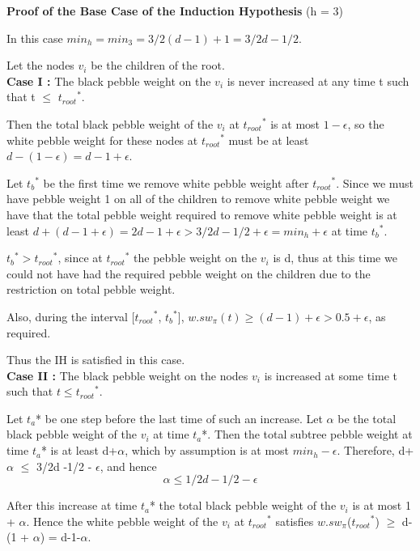 \documentclass[12pt]{article}
\newcommand{\troots}{{t_{root}}^*}
\newcommand{\tbs}{{t_b}^{*}}
\begin{document}
\noindent
{\bf Proof of the Base Case of the Induction Hypothesis}  (h = 3)

In this case $min_h = min_3 = 3/2(d-1) + 1 = 3/2d -1/2$.

Let the nodes $v_i$ be the children of the root.\\

\noindent
{\bf Case I :} The black pebble weight on the $v_i$ is never increased at any time t such that t $\leq$
$\troots$.  

Then the total black pebble weight of the $v_i$ at
$\troots$ is at most $1-\epsilon$, so the white pebble weight for these nodes at
$\troots$ must be at least $d-(1-\epsilon) = d-1+ \epsilon$.

Let $\tbs$ be the first time we remove white pebble weight after $\troots$. Since we must have pebble weight 1 on all of the children to remove white pebble weight we have that the total pebble weight required to remove white
pebble weight is at least
$d+(d - 1 + \epsilon) = 2d - 1 + \epsilon > 3/2d - 1/2 + \epsilon = min_h + \epsilon$ at time $\tbs$. 

$\tbs > \troots$, since at $\troots$ the pebble weight on the $v_i$ is d, thus at this time we could not have had the required pebble weight on the children due to the restriction on total pebble weight.

Also, during the interval [$\troots$, $\tbs$],
$w.sw_\pi(t) \geq (d-1) + \epsilon > 0.5 + \epsilon$, as required. 

Thus the IH is satisfied in this case.\\

\noindent
{\bf Case II :}  The black pebble weight on the nodes $v_i$ is increased at some time t such that $t \leq
\troots$.  

Let $t_a$* be one step before the last time of such an increase.
Let $\alpha$ be the total black pebble weight of the $v_i$ at time $t_a$*.
Then the total subtree pebble weight at time $t_a$* is at least d+$\alpha$,
which by assumption is at most $min_h - \epsilon$.  Therefore, d+ $\alpha$ $\le$ 3/2d -1/2 - $\epsilon$, and hence 
\begin{equation}\alpha \le 1/2d - 1/2 - \epsilon \label{05eps}\end{equation}
      
After this increase at time $t_a$* the total black pebble weight of the $v_i$
is at most 1 + $\alpha$.  Hence the white pebble weight of the $v_i$ at
$\troots$ satisfies $w.sw_\pi$($\troots$) $\ge$ d-(1 + $\alpha$) = d-1-$\alpha$.
    
\end{document}
